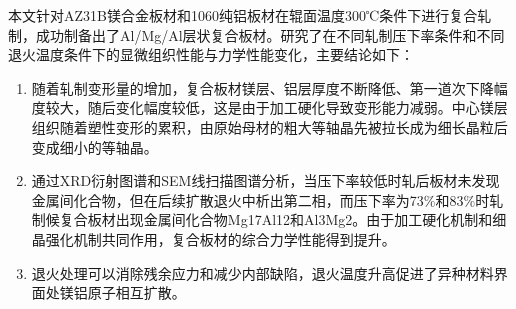 

	本文针对AZ31B镁合金板材和1060纯铝板材在辊面温度300℃条件下进行复合轧制，成功制备出了Al/Mg/Al层状复合板材。研究了在不同轧制压下率条件和不同退火温度条件下的显微组织性能与力学性能变化，主要结论如下：\par
	\begin{enumerate}
		\item 随着轧制变形量的增加，复合板材镁层、铝层厚度不断降低、第一道次下降幅度较大，随后变化幅度较低，这是由于加工硬化导致变形能力减弱。中心镁层组织随着塑性变形的累积，由原始母材的粗大等轴晶先被拉长成为细长晶粒后变成细小的等轴晶。
		
		\item 通过XRD衍射图谱和SEM线扫描图谱分析，当压下率较低时轧后板材未发现金属间化合物，但在后续扩散退火中析出第二相，而压下率为73$\%$和83$\%$时轧制候复合板材出现金属间化合物Mg17Al12和Al3Mg2。由于加工硬化机制和细晶强化机制共同作用，复合板材的综合力学性能得到提升。
		
		\item 退火处理可以消除残余应力和减少内部缺陷，退火温度升高促进了异种材料界面处镁铝原子相互扩散。 
				
	\end{enumerate}
	